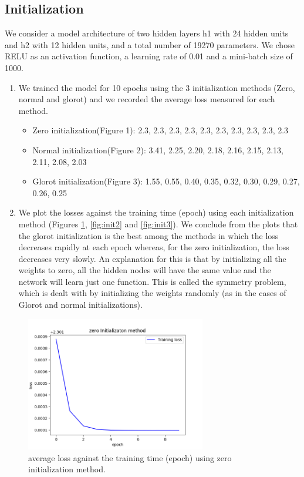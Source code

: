 \documentclass[a4paper]{article}
\begin{document}
\subsection{Initialization}
We consider a model architecture of two hidden layers h1  with 24 hidden units and h2  with 12 hidden units, and a total number of 19270 parameters. We chose RELU as an activation function, a learning rate of 0.01 and a mini-batch size of 1000.
\begin{enumerate}
  \item We trained the model for 10 epochs using the 3 initialization methods (Zero, normal and glorot) and we recorded the average
loss measured for each method.

\begin{itemize}
  \item Zero initialization(Figure 1): 2.3, 2.3, 2.3, 2.3, 2.3, 2.3, 2.3, 2.3, 2.3, 2.3
  \item Normal initialization(Figure 2): 3.41, 2.25, 2.20, 2.18, 2.16, 2.15, 2.13, 2.11, 2.08, 2.03
  \item Glorot initialization(Figure 3): 1.55, 0.55, 0.40, 0.35, 0.32, 0.30, 0.29, 0.27, 0.26, 0.25
\end{itemize}

\item We plot the losses against the training time (epoch) using each initialization method (Figures \ref{fig:init1}, \ref{fig:init2} and \ref{fig:init3}). We conclude from the plots that the glorot initialization is the best among the methods in which the loss decreases rapidly at each epoch whereas, for the zero initialization, the loss decreases very slowly. An explanation for this is that by initializing all the weights to zero, all the hidden nodes will have the same value and the network will learn just one function. This is called the symmetry problem, which is dealt with by initializing the weights randomly (as in the cases of Glorot and normal initializations)\cite{weights}.

\end{enumerate}


\begin{figure}
\centering
\includegraphics[width=0.7\textwidth]{zero_init.png}
\caption{\label{fig:init1}average loss against the training time (epoch) using zero initialization method.}
\end{figure}
\end{document}
